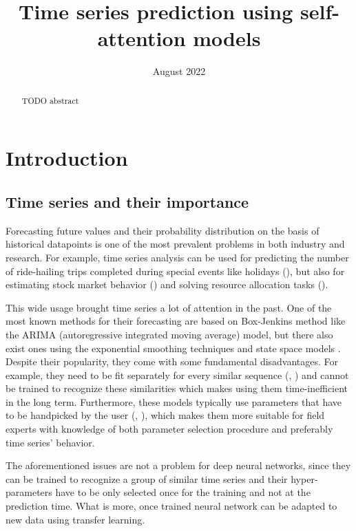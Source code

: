 \documentclass[en]{pracamgr}
\title{Time series prediction using self-attention models}
\date{August 2022}
\begin{document}
\maketitle

\begin{abstract}
  TODO abstract
\end{abstract}

\tableofcontents

\chapter{Introduction}
\section{Time series and their importance}\label{r:tsi}

Forecasting future values and their probability distribution on the basis of historical datapoints is one of the most prevalent problems in both industry and research.
For example, time series analysis can be used for predicting the number of ride-hailing trips completed during special events like holidays (\cite{uber}), but also for estimating stock market behavior (\cite{stock1}) and solving resource allocation tasks (\cite{graph-forecast}). 

This wide usage brought time series a lot of attention in the past. One of the most known methods for their forecasting are based on Box-Jenkins method like the ARIMA (autoregressive integrated moving average) \cite{arima} model, but there also exist ones using the exponential smoothing techniques and state space models \cite{ssm}. Despite their popularity, they come with some fundamental disadvantages. For example, they need to be fit separately for every similar sequence (\cite{enhancing}, \cite{deepar}) and cannot be trained to recognize these similarities which makes using them time-inefficient in the long term.
Furthermore, these models typically use parameters that have to be handpicked by the user (\cite{enhancing},
\cite{deepar}), which makes them more suitable for field experts with knowledge of both parameter selection procedure and preferably time series' behavior.


The aforementioned issues are not a problem for deep neural networks, since they can be trained to recognize a group of similar time series and their hyper-parameters have to be only selected once for the training and not at the prediction time. What is more, once trained neural network can be adapted to new data using transfer learning. 
\end{document}

